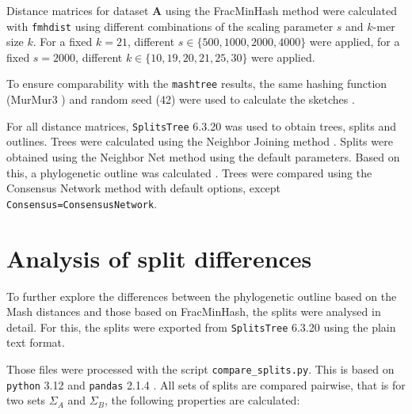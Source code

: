 Distance matrices for dataset \textbf{A} using the FracMinHash method
\cite{heraDerivingConfidenceIntervals2023,irberLightweightCompositionalAnalysis2022}
were calculated with \texttt{fmhdist} using different combinations of the
scaling parameter $s$ and $k$-mer size $k$. For a fixed $k=21$, different $s \in
\{500, 1000, 2000, 4000\}$ were applied, for a fixed $s=2000$, different $k \in
\{10, 19, 20, 21, 25, 30\}$ were applied.

To ensure comparability with the \texttt{mashtree} results, the same hashing
function (MurMur3 \cite{applebyAapplebySmhasher,ZeroAllocationHashing2022}) and
random seed (42) were used to calculate the sketches
\cite{katzMashtreeRapidComparison2019,ondovMashFastGenome2016}.

For all distance matrices, \texttt{SplitsTree} 6.3.20
\cite{husonApplicationPhylogeneticNetworks2006} was used to obtain trees, splits
and outlines. Trees were calculated using the Neighbor Joining method
\cite{saitouNeighborjoiningMethodNew1987}. Splits were obtained using the
Neighbor Net method
\cite{bryantNeighborNetAgglomerativeMethod2004,bryantNeighborNetImprovedAlgorithms2023}
using the default parameters. Based on this, a phylogenetic outline was
calculated \cite{bagciMicrobialPhylogeneticContext2021}. Trees were compared
using  the Consensus Network method \cite{hollandUsingConsensusNetworks2004}
with default options, except \texttt{Consensus=ConsensusNetwork}.



\section{Analysis of split differences}
\label{sec:splitanalysis}
To further explore the differences between the phylogenetic outline based on the
Mash distances and those based on FracMinHash, the splits were analysed in
detail. For this, the splits were exported from \texttt{SplitsTree} 6.3.20
\cite{husonApplicationPhylogeneticNetworks2006} using the plain text format.

Those files were processed with the script \texttt{compare\_splits.py}. This is
based on \texttt{python} 3.12 \cite{vanrossumPythonReferenceManual2009} and
\texttt{pandas} 2.1.4
\cite{PandasdevPandasPandas2024,mckinneyDataStructuresStatistical2010}. All sets
of splits are compared pairwise, that is for two sets $\Sigma_A$ and $\Sigma_B$,
the following properties are calculated:

